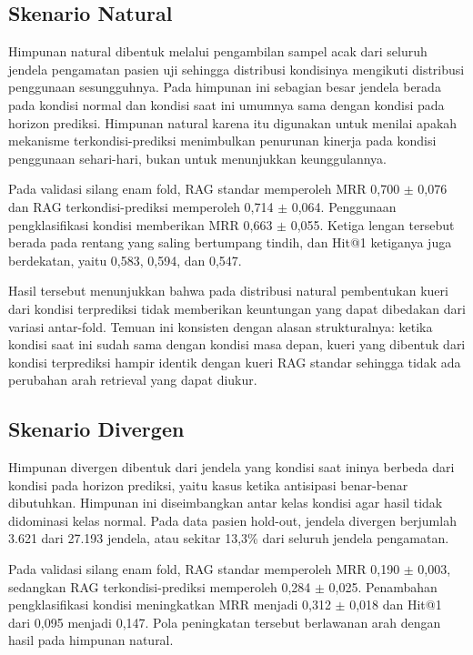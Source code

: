 \subsection{Skenario Natural}
\label{subsec:bab6-skenario-natural}

Himpunan natural dibentuk melalui pengambilan sampel acak dari seluruh jendela pengamatan pasien uji sehingga distribusi kondisinya mengikuti distribusi
penggunaan sesungguhnya. Pada himpunan ini sebagian besar jendela berada pada kondisi normal dan kondisi saat ini umumnya sama dengan kondisi pada horizon
prediksi. Himpunan natural karena itu digunakan untuk menilai apakah mekanisme terkondisi-prediksi menimbulkan penurunan kinerja pada kondisi penggunaan
sehari-hari, bukan untuk menunjukkan keunggulannya.

Pada validasi silang enam fold, RAG standar memperoleh MRR 0,700 $\pm$ 0,076 dan RAG terkondisi-prediksi memperoleh 0,714 $\pm$ 0,064. Penggunaan pengklasifikasi
kondisi memberikan MRR 0,663 $\pm$ 0,055. Ketiga lengan tersebut berada pada rentang yang saling bertumpang tindih, dan Hit@1 ketiganya juga berdekatan, yaitu
0,583, 0,594, dan 0,547.

Hasil tersebut menunjukkan bahwa pada distribusi natural pembentukan kueri dari kondisi terprediksi tidak memberikan keuntungan yang dapat dibedakan dari variasi antar-fold. Temuan
ini konsisten dengan alasan strukturalnya: ketika kondisi saat ini sudah sama dengan kondisi masa depan, kueri yang dibentuk dari kondisi terprediksi hampir
identik dengan kueri RAG standar sehingga tidak ada perubahan arah retrieval yang dapat diukur.

\subsection{Skenario Divergen}
\label{subsec:bab6-skenario-divergen}

Himpunan divergen dibentuk dari jendela yang kondisi saat ininya berbeda dari kondisi pada horizon prediksi, yaitu kasus ketika antisipasi benar-benar
dibutuhkan.
Himpunan ini diseimbangkan antar kelas kondisi agar hasil tidak didominasi kelas normal. Pada data pasien hold-out, jendela divergen berjumlah 3.621 dari 27.193
jendela, atau sekitar 13,3\% dari seluruh jendela pengamatan.

Pada validasi silang enam fold, RAG standar memperoleh MRR 0,190 $\pm$ 0,003, sedangkan RAG terkondisi-prediksi memperoleh 0,284 $\pm$ 0,025. Penambahan
pengklasifikasi kondisi meningkatkan MRR menjadi 0,312 $\pm$ 0,018 dan Hit@1 dari 0,095 menjadi 0,147. Pola peningkatan tersebut berlawanan arah dengan hasil pada
himpunan natural.

